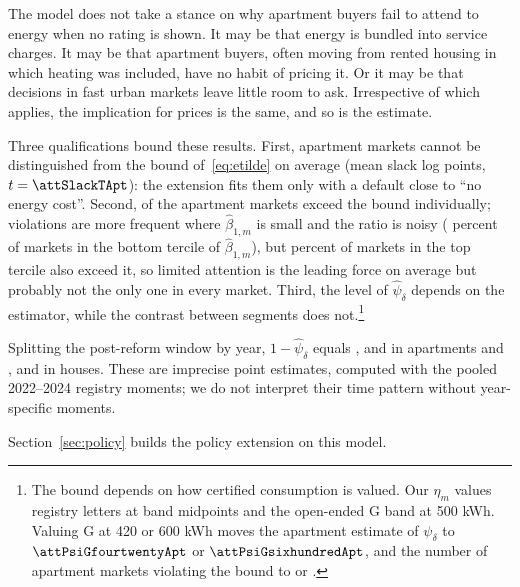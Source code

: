 The model does not take a stance on why apartment buyers fail to attend to energy when no rating is shown. It may be that energy is bundled into service charges. It may be that apartment buyers, often moving from rented housing in which heating was included, have no habit of pricing it. Or it may be that decisions in fast urban markets leave little room to ask. Irrespective of which applies, the implication for prices is the same, and so is the estimate.

Three qualifications bound these results. First, apartment markets cannot be distinguished from the bound of~\eqref{eq:etilde} on average (mean slack \attSlackApt{} log points, $t=\attSlackTApt$): the extension fits them only with a default close to ``no energy cost''. Second, \attNViolApt{} of the \attNMarketsApt{} apartment markets exceed the bound individually; violations are more frequent where $\hat\beta_{1,m}$ is small and the ratio is noisy (\attShareViolBottomApt{} percent of markets in the bottom tercile of $\hat\beta_{1,m}$), but \attShareViolTopApt{} percent of markets in the top tercile also exceed it, so limited attention is the leading force on average but probably not the only one in every market. Third, the level of $\hat\psi_\delta$ depends on the estimator, while the contrast between segments does not.\footnote{The bound depends on how certified consumption is valued. Our $\eta_m$ values registry letters at band midpoints and the open-ended G band at 500 kWh. Valuing G at 420 or 600 kWh moves the apartment estimate of $\psi_\delta$ to $\attPsiGfourtwentyApt$ or $\attPsiGsixhundredApt$, and the number of apartment markets violating the bound to \attNViolGfourtwentyApt{} or \attNViolGsixhundredApt. %
}

Splitting the post-reform window by year, $1-\hat\psi_\delta$ equals \attOneMinusPsiYoneApt, \attOneMinusPsiYtwoApt{} and \attOneMinusPsiYthreeApt{} in apartments and \attOneMinusPsiYoneHouse, \attOneMinusPsiYtwoHouse{} and \attOneMinusPsiYthreeHouse{} in houses. These are imprecise point estimates, computed with the pooled 2022--2024 registry moments; we do not interpret their time pattern without year-specific moments. %

Section~\ref{sec:policy} builds the policy extension on this model.
